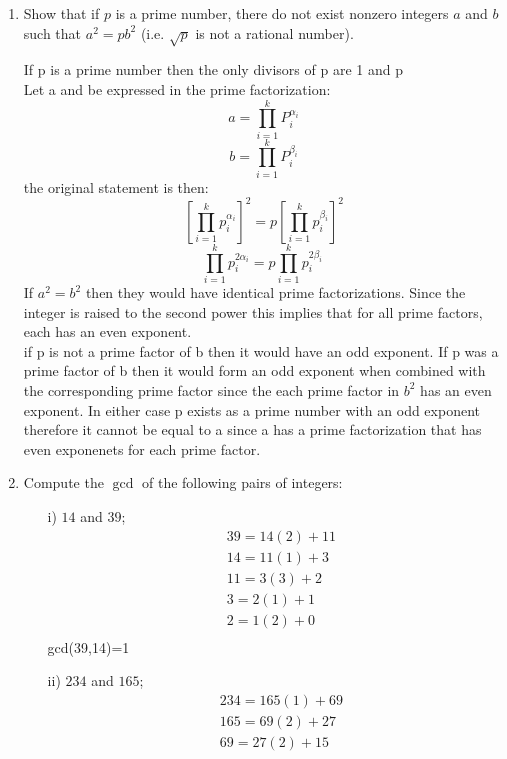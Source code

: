\documentclass[11pt]{article}
\theoremstyle{definition}  %
\begin{document}
\begin{enumerate}
\begin{proof}
\begin{align*}
  &\therefore (1 + x)^n\geq nx+1\\
  &\text{ Which implies }\\
  &(1 + x)^n-1\geq nx
\end{align*}
\end{proof}
\item Show that if $p$ is a prime number, there do not exist nonzero integers $a$ and $b$ such that $a^2 = pb^2$ (i.e. $\sqrt{p}$ is not a rational number).\\
\begin{Proof} If p is a prime number then the only divisors of p are 1 and p\\
Let a and be expressed in the prime factorization:
\[
  a=\prod_{i=1}^kP_i^{\alpha_i}
\]
\[
  b=\prod_{i=1}^kP_i^{\beta_i}
\]
the original statement is then:
\[
  \left[\prod_{i=1}^kp_i^{\alpha_i}\right]^2=p\left[\prod_{i=1}^kp_i^{\beta_i}\right]^2
\]
\[
  \prod_{i=1}^kp_i^{2\alpha_i}=p\prod_{i=1}^kp_i^{2\beta_i}\
\]
If $a^2=b^2$ then they would have identical prime factorizations. Since the integer is raised to the second power this implies that for all prime factors, each has an even exponent. \\
if p is not a prime factor of b then it would have an odd exponent. If p was a prime factor of b then it would form an odd exponent when combined with the corresponding prime factor since the each prime factor in $b^2$ has an even exponent.  In either case p exists as a prime number with an odd exponent therefore it cannot be equal to a since a has a prime factorization that has even exponenets for each prime factor.
\end{Proof}
\item Compute the $\gcd$ of the following pairs of integers:
  \begin{itemize}
  \item[i)] $14$ and $39$;
  \begin{align*}
    &39=14(2)+11\\
    &14=11(1)+3\\
    &11=3(3)+2\\
    &3=2(1)+1\\
    &2=1(2)+0\\
  \end{align*}
    gcd(39,14)=1
  \item[ii)] $234$ and $165$;
  \begin{align*}
  &234=165(1)+69\\
  &165=69(2)+27\\
  &69=27(2)+15\\

\end{align*}
\end{itemize}
\end{enumerate}
\end{document}
